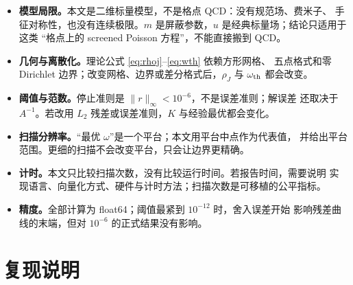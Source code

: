 \documentclass[UTF8,fontset=windows,a4paper,11pt]{ctexart}
\begin{document}
\begin{itemize}[leftmargin=2.1em,itemsep=0.15em,topsep=0.2em]
\item \textbf{模型局限。}本文是二维标量模型，不是格点 QCD：没有规范场、费米子、
手征对称性，也没有连续极限。$m$ 是屏蔽参数，$u$ 是经典标量场；结论只适用于这类
“格点上的 screened Poisson 方程”，不能直接搬到 QCD。
\item \textbf{几何与离散化。}理论公式 \eqref{eq:rhoj}--\eqref{eq:wth} 依赖方形网格、
五点格式和零 Dirichlet 边界；改变网格、边界或差分格式后，$\rho_J$ 与
$\omega_{\rm th}$ 都会改变。
\item \textbf{阈值与范数。}停止准则是 $\|r\|_\infty<10^{-6}$，不是误差准则；解误差
还取决于 $A^{-1}$。若改用 $L_2$ 残差或误差准则，$K$ 与经验最优都会变化。
\item \textbf{扫描分辨率。}“最优 $\omega$”是一个平台；本文用平台中点作为代表值，
并给出平台范围。更细的扫描不会改变平台，只会让边界更精确。
\item \textbf{计时。}本文只比较扫描次数，没有比较运行时间。若报告时间，需要说明
实现语言、向量化方式、硬件与计时方法；扫描次数是可移植的公平指标。
\item \textbf{精度。}全部计算为 float64；阈值最紧到 $10^{-12}$ 时，舍入误差开始
影响残差曲线的末端，但对 $10^{-6}$ 的正式结果没有影响。
\end{itemize}

\appendix
\section{复现说明}
\label{app:repro}
\end{document}
